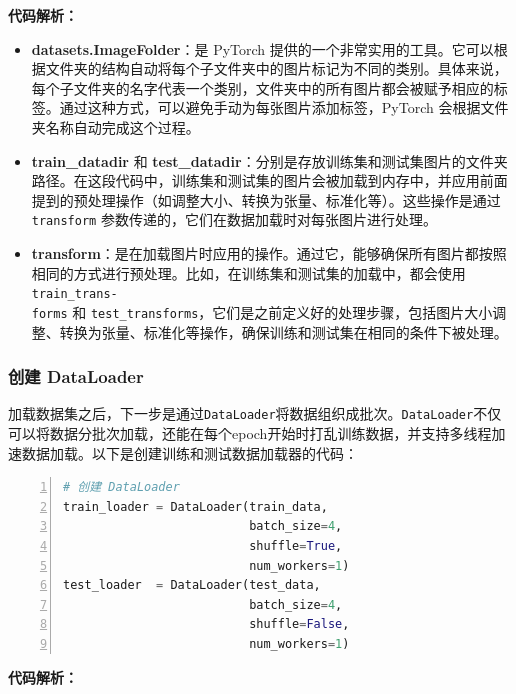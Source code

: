 \textbf{代码解析：}
\begin{itemize} 
    \item \textbf{datasets.ImageFolder}：是 PyTorch 提供的一个非常实用的工具。它可以根据文件夹的结构自动将每个子文件夹中的图片标记为不同的类别。具体来说，每个子文件夹的名字代表一个类别，文件夹中的所有图片都会被赋予相应的标签。通过这种方式，可以避免手动为每张图片添加标签，PyTorch 会根据文件夹名称自动完成这个过程。 
    \item \textbf{train\_datadir} 和 \textbf{test\_datadir}：分别是存放训练集和测试集图片的文件夹路径。在这段代码中，训练集和测试集的图片会被加载到内存中，并应用前面提到的预处理操作（如调整大小、转换为张量、标准化等）。这些操作是通过 \texttt{transform} 参数传递的，它们在数据加载时对每张图片进行处理。 

    \item \textbf{transform}：是在加载图片时应用的操作。通过它，能够确保所有图片都按照相同的方式进行预处理。比如，在训练集和测试集的加载中，都会使用 \texttt{train\_trans-\\forms} 和 \texttt{test\_transforms}，它们是之前定义好的处理步骤，包括图片大小调整、转换为张量、标准化等操作，确保训练和测试集在相同的条件下被处理。 
\end{itemize}

\subsubsection{创建 DataLoader}

加载数据集之后，下一步是通过\texttt{DataLoader}将数据组织成批次。\texttt{DataLoader}不仅可以将数据分批次加载，还能在每个epoch开始时打乱训练数据，并支持多线程加速数据加载。以下是创建训练和测试数据加载器的代码：

\begin{lstlisting}[language={python},label={数据加载器},caption={创建 DataLoader}, basicstyle=\footnotesize\ttfamily, breaklines=true, numbers=left, frame=single,keepspaces=true,showstringspaces=false]
# 创建 DataLoader
train_loader = DataLoader(train_data,
                          batch_size=4,
                          shuffle=True,
                          num_workers=1)
test_loader  = DataLoader(test_data,
                          batch_size=4,
                          shuffle=False,
                          num_workers=1)
\end{lstlisting}
\textbf{代码解析：}

